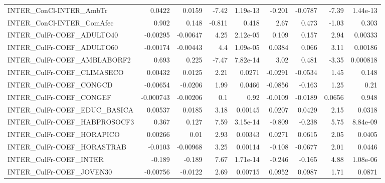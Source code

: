 \begin{tabular}{lrrrrrrrr}
INTER\_ConCl-INTER\_AmbTr                &      0.0422 &       0.0159 &    -7.42 & 1.19e-13 &     -0.201 &     -0.0787 &        -7.39 &      1.44e-13 \\
INTER\_ConCl-INTER\_ComAfec              &       0.902 &        0.148 &   -0.811 &    0.418 &       2.67 &       0.473 &        -1.03 &         0.303 \\
INTER\_CulFr-COEF\_ADULTO40              &    -0.00295 &     -0.00647 &     4.25 & 2.12e-05 &      0.109 &       0.157 &         2.94 &       0.00333 \\
INTER\_CulFr-COEF\_ADULTO60              &    -0.00174 &     -0.00443 &      4.4 & 1.09e-05 &     0.0384 &       0.066 &         3.11 &       0.00186 \\
INTER\_CulFr-COEF\_AMBLABORF2            &       0.693 &        0.225 &    -7.47 & 7.82e-14 &       3.02 &       0.481 &        -3.35 &      0.000818 \\
INTER\_CulFr-COEF\_CLIMASECO             &     0.00432 &       0.0125 &     2.21 &   0.0271 &    -0.0291 &     -0.0534 &         1.45 &         0.148 \\
INTER\_CulFr-COEF\_CONGCD                &    -0.00654 &      -0.0206 &     1.99 &   0.0466 &    -0.0856 &      -0.163 &         1.25 &          0.21 \\
INTER\_CulFr-COEF\_CONGEF                &   -0.000743 &     -0.00206 &      0.1 &     0.92 &    -0.0109 &     -0.0189 &       0.0656 &         0.948 \\
INTER\_CulFr-COEF\_EDUC\_BASICA           &     0.00537 &       0.0185 &     3.18 &  0.00145 &     0.0207 &      0.0429 &         2.15 &        0.0318 \\
INTER\_CulFr-COEF\_HABPROSOCF3           &       0.367 &        0.127 &     7.59 & 3.15e-14 &     -0.809 &      -0.238 &         5.75 &      8.84e-09 \\
INTER\_CulFr-COEF\_HORAPICO              &     0.00266 &         0.01 &     2.93 &  0.00343 &     0.0271 &      0.0615 &         2.05 &        0.0405 \\
INTER\_CulFr-COEF\_HORASTRAB             &     -0.0103 &     -0.00968 &     3.25 &  0.00114 &     -0.108 &     -0.0677 &         2.01 &        0.0446 \\
INTER\_CulFr-COEF\_INTER                 &      -0.189 &       -0.189 &     7.67 & 1.71e-14 &     -0.246 &      -0.165 &         4.88 &      1.08e-06 \\
INTER\_CulFr-COEF\_JOVEN30               &    -0.00756 &      -0.0122 &     2.69 &  0.00715 &     0.0952 &      0.0987 &         1.71 &        0.0871 \\

\end{tabular}

